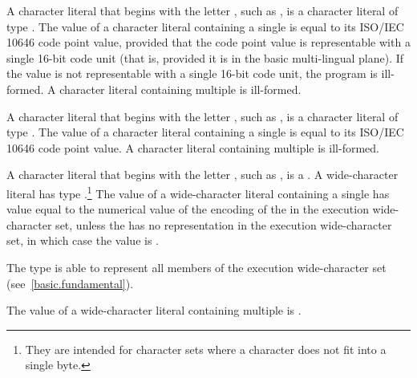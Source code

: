 \pnum
{}%
%
%
A character literal that
begins with the letter , such as ,
%
is a character literal of type . The value
of a  character literal containing a single  is
equal to its ISO/IEC 10646 code point value, provided that the code point value is
representable with a single 16-bit code unit (that is, provided it is in the
basic multi-lingual plane). If the value is not representable
with a single 16-bit code unit, the program is ill-formed. A  character literal
containing multiple  is ill-formed.

\pnum
{}%
%
%
A character literal that
begins with the letter , such as ,
%
is a character literal of type . The value of a
 character literal containing a single  is equal
to its ISO/IEC 10646 code point value. A  character literal containing
multiple  is ill-formed.

\pnum
{}%
%
%
%
A character literal that
begins with the letter , such as ,
%
is a . A wide-character literal has type
.\footnote{They are intended for character sets where a character does
not fit into a single byte. }
The value of a wide-character literal containing a single
 has value equal to the numerical value of the encoding
of the  in the execution wide-character set, unless the
 has no representation in the execution wide-character set, in which
case the value is . \begin{note} The type  is able to
represent all members of the execution wide-character set (see~\ref{basic.fundamental}).
\end{note} The value
of a wide-character literal containing multiple  is
.

